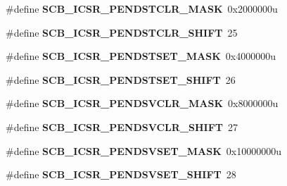 \begin{DoxyCompactItemize}
\item 
\hypertarget{group___s_c_b___register___masks_ga7dc9d2d6061166d9cfa66904477acd2e}{}\#define {\bfseries S\+C\+B\+\_\+\+I\+C\+S\+R\+\_\+\+P\+E\+N\+D\+S\+T\+C\+L\+R\+\_\+\+M\+A\+S\+K}~0x2000000u\label{group___s_c_b___register___masks_ga7dc9d2d6061166d9cfa66904477acd2e}

\item 
\hypertarget{group___s_c_b___register___masks_ga4681662981a7a9ce4c39ba42e79bdf36}{}\#define {\bfseries S\+C\+B\+\_\+\+I\+C\+S\+R\+\_\+\+P\+E\+N\+D\+S\+T\+C\+L\+R\+\_\+\+S\+H\+I\+F\+T}~25\label{group___s_c_b___register___masks_ga4681662981a7a9ce4c39ba42e79bdf36}

\item 
\hypertarget{group___s_c_b___register___masks_gaec656bf7e4d2fdcacfe0ef3e16397a04}{}\#define {\bfseries S\+C\+B\+\_\+\+I\+C\+S\+R\+\_\+\+P\+E\+N\+D\+S\+T\+S\+E\+T\+\_\+\+M\+A\+S\+K}~0x4000000u\label{group___s_c_b___register___masks_gaec656bf7e4d2fdcacfe0ef3e16397a04}

\item 
\hypertarget{group___s_c_b___register___masks_ga048d1683c88c61f80f5c80173bf5e981}{}\#define {\bfseries S\+C\+B\+\_\+\+I\+C\+S\+R\+\_\+\+P\+E\+N\+D\+S\+T\+S\+E\+T\+\_\+\+S\+H\+I\+F\+T}~26\label{group___s_c_b___register___masks_ga048d1683c88c61f80f5c80173bf5e981}

\item 
\hypertarget{group___s_c_b___register___masks_ga12a45a6af09cbefd431d033d8411220e}{}\#define {\bfseries S\+C\+B\+\_\+\+I\+C\+S\+R\+\_\+\+P\+E\+N\+D\+S\+V\+C\+L\+R\+\_\+\+M\+A\+S\+K}~0x8000000u\label{group___s_c_b___register___masks_ga12a45a6af09cbefd431d033d8411220e}

\item 
\hypertarget{group___s_c_b___register___masks_gad7a5894ad98606b443ab6f1b52f2bc36}{}\#define {\bfseries S\+C\+B\+\_\+\+I\+C\+S\+R\+\_\+\+P\+E\+N\+D\+S\+V\+C\+L\+R\+\_\+\+S\+H\+I\+F\+T}~27\label{group___s_c_b___register___masks_gad7a5894ad98606b443ab6f1b52f2bc36}

\item 
\hypertarget{group___s_c_b___register___masks_ga5ed59a5d03a7d25ef76aa9d92e25e4a5}{}\#define {\bfseries S\+C\+B\+\_\+\+I\+C\+S\+R\+\_\+\+P\+E\+N\+D\+S\+V\+S\+E\+T\+\_\+\+M\+A\+S\+K}~0x10000000u\label{group___s_c_b___register___masks_ga5ed59a5d03a7d25ef76aa9d92e25e4a5}

\item 
\hypertarget{group___s_c_b___register___masks_ga76cddcbf872958b00237c662309251d2}{}\#define {\bfseries S\+C\+B\+\_\+\+I\+C\+S\+R\+\_\+\+P\+E\+N\+D\+S\+V\+S\+E\+T\+\_\+\+S\+H\+I\+F\+T}~28\label{group___s_c_b___register___masks_ga76cddcbf872958b00237c662309251d2}


\end{DoxyCompactItemize}
